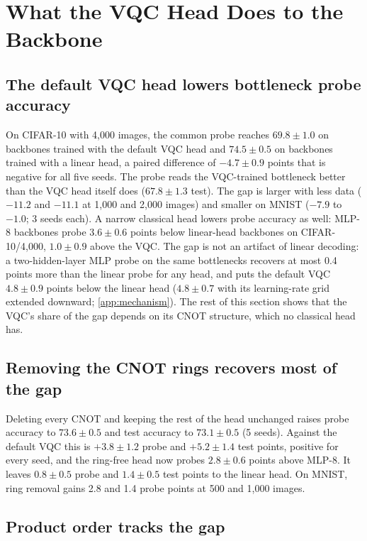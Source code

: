 \section{What the VQC Head Does to the Backbone}
\label{sec:backbone}

\subsection{The default VQC head lowers bottleneck probe accuracy}
\label{sec:gap}

On CIFAR-10 with 4,000 images, the common probe reaches $69.8\pm1.0$ on backbones trained
with the default VQC head and $74.5\pm0.5$ on backbones trained with a linear head, a paired
difference of $-4.7\pm0.9$ points that is negative for all five seeds. The probe reads the
VQC-trained bottleneck better than the VQC head itself does ($67.8\pm1.3$ test). The gap is larger with less data ($-11.2$ and $-11.1$ at 1,000 and
2,000 images) and smaller on MNIST ($-7.9$ to $-1.0$; 3 seeds each). A narrow classical head
lowers probe accuracy as well: MLP-8 backbones probe $3.6\pm0.6$ points below linear-head
backbones on CIFAR-10/4,000, $1.0\pm0.9$ above the VQC. The gap is not an artifact of linear
decoding: a two-hidden-layer MLP probe on the same bottlenecks recovers at most 0.4 points more than
the linear probe for any head, and puts the default VQC $4.8\pm0.9$ points below the linear
head ($4.8\pm0.7$ with its learning-rate grid extended downward; \cref{app:mechanism}). The rest of this section shows that the VQC's share
of the gap depends on its CNOT structure, which no classical head has.

\subsection{Removing the CNOT rings recovers most of the gap}
\label{sec:ring}

Deleting every CNOT and keeping the rest of the head unchanged raises probe accuracy to
$73.6\pm0.5$ and test accuracy to $73.1\pm0.5$ (5 seeds). Against the default VQC this is
$+3.8\pm1.2$ probe and $+5.2\pm1.4$ test points, positive for every seed, and the ring-free
head now probes $2.8\pm0.6$ points above MLP-8. It leaves $0.8\pm0.5$ probe and $1.4\pm0.5$
test points to the linear head. On MNIST, ring removal gains 2.8 and 1.4 probe
points at 500 and 1,000 images.

\subsection{Product order tracks the gap}
\label{sec:order}


